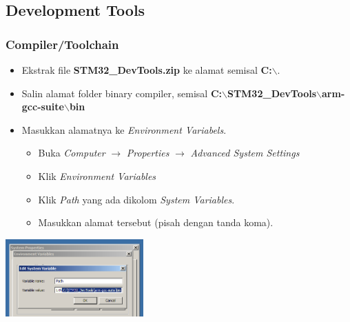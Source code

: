 \documentclass[table,dvipsnames]{beamer}
\begin{document}
	\subsection{Development Tools}
	\begin{frame}
		\frametitle{Compiler/Toolchain}
		\begin{block}{}
			\begin{itemize}
				\item Ekstrak file \textbf{STM32\_DevTools.zip} ke alamat semisal \textbf{C:$\backslash$}.
				\item Salin alamat folder binary compiler, semisal \textbf{C:$\backslash$STM32\_DevTools$\backslash$arm-gcc-suite$\backslash$bin}
				\item Masukkan alamatnya ke \textit{Environment Variabels}.
				\begin{itemize}
					\item Buka \textit{Computer} $\rightarrow$ \textit{Properties} $\rightarrow$ \textit{Advanced System Settings}
					\item Klik \textit{Environment Variables}
					\item Klik \textit{Path} yang ada dikolom \textit{System Variables}.
					\item Masukkan alamat tersebut (pisah dengan tanda koma).
				\end{itemize}
			\end{itemize}
		\end{block}
	
		\begin{center}
			\includegraphics[width=150pt]{images/envar}
		\end{center}
	\end{frame}
\end{document}
